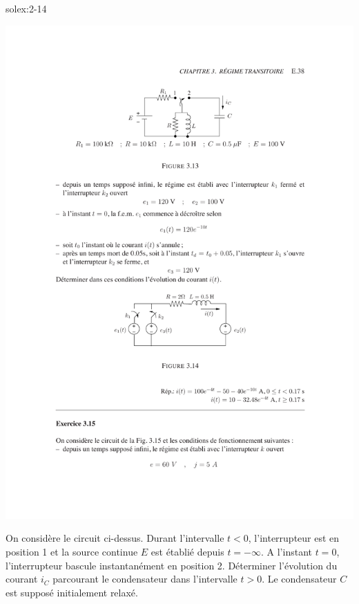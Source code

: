 \begin{exwithsol}{solex:2-14}
\begin{exercise}{}
	\label{ex:2-13}
	\begin{center}
		\includegraphics[width=\linewidth]{exercices/ex-3-13}
	\end{center}
	On consid\`ere le circuit ci-dessus. Durant
	l'intervalle $t<0$, l'interrupteur est en position 1 et la source
	continue $E$ est \'etabli\'e depuis $t=-\infty$. A l'instant $t=0$,
	l'interrupteur bascule instantan\'ement en position 2. D\'eterminer
	l'\'evolution du courant $i_C$ parcourant le condensateur dans
	l'intervalle $t>0$. Le condensateur $C$ est suppos\'e initialement
	relax\'e.
	
\end{exercise}


\end{exwithsol}
